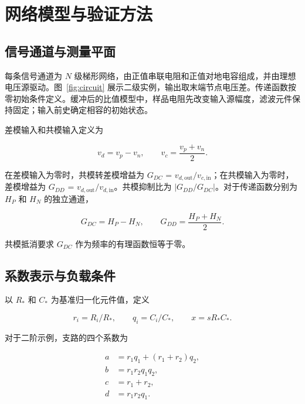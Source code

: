 \section{网络模型与验证方法}

\subsection{信号通道与测量平面}
\label{sec:model-plane}

每条信号通道为 $N$ 级梯形网络，由正值串联电阻和正值对地电容组成，并由理想电压源驱动。图~\ref{fig:circuit} 展示二级实例，输出取末端节点电压差。传递函数按零初始条件定义。缓冲后的比值模型中，样品电阻先改变输入源幅度，滤波元件保持固定；输入前史确定相容的初始状态。

差模输入和共模输入定义为

\begin{equation}\label{eq:1}
v_d=v_p-v_n,\qquad v_c=\frac{v_p+v_n}{2}.
\end{equation}

在差模输入为零时，共模转差模增益为 \(G_{DC}\) = \(v_{d,\mathrm{out}}/v_{c,\mathrm{in}}\)；在共模输入为零时，差模增益为 \(G_{DD}\) = \(v_{d,\mathrm{out}}/v_{d,\mathrm{in}}\)。共模抑制比为 \(\lvert G_{DD}/G_{DC}\rvert\)。对于传递函数分别为 \(H_P\) 和 \(H_N\) 的独立通道，

\begin{equation}\label{eq:2}
G_{DC}=H_P-H_N,\qquad
G_{DD}=\frac{H_P+H_N}{2}.
\end{equation}

共模抵消要求 \(G_{DC}\) 作为频率的有理函数恒等于零。



\subsection{系数表示与负载条件}
\label{sec:coefficients}

以 \(R_*\) 和 \(C_*\) 为基准归一化元件值，定义

\begin{equation}\label{eq:3}
r_i=R_i/R_*,\qquad q_i=C_i/C_*,\qquad x=sR_*C_*.
\end{equation}

对于二阶示例，支路的四个系数为

\begin{equation}\label{eq:4}
\begin{aligned}
a&=r_1q_1+(r_1+r_2)q_2,\\
b&=r_1r_2q_1q_2,\\
c&=r_1+r_2,\\
d&=r_1r_2q_1.
\end{aligned}
\end{equation}

